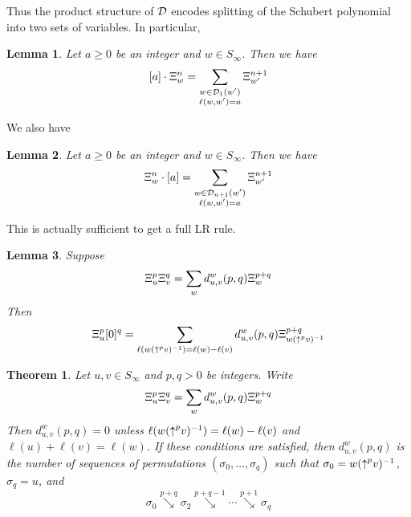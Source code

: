 \documentclass{amsart}
\newtheorem{lemma}{Lemma}[subsection]
\newtheorem{theorem}{Theorem}[section]
\theoremstyle{definition}
\theoremstyle{remark}
\numberwithin{equation}{subsection}
\newcommand{\downvar}[1]{\stackrel{#1}{\searrow}}
\begin{document}
Thus the product structure of $\mathcal{D}$ encodes splitting of the Schubert polynomial into two sets of variables. In particular,
\begin{lemma} \label{lemma:dpieri}
Let $a\geq 0$ be an integer and $w\in S_\infty$. Then we have
$$[a]\cdot \Xi_{w}^{n} = \sum_{\substack{w\in\mathcal{D}_1(w')\\\ell(w,w')=a}} \Xi_{w'}^{n+1}$$
\end{lemma}

We also have
\begin{lemma} \label{lemma:dpieriend}
Let $a\geq 0$ be an integer and $w\in S_\infty$. Then we have
$$\Xi_{w}^{n}\cdot [a] = \sum_{\substack{w\in\mathcal{D}_{n+1}(w')\\\ell(w,w')=a}} \Xi_{w'}^{n+1}$$
\end{lemma}


This is actually sufficient to get a full LR rule.

\begin{lemma}
Suppose
$$\Xi_u^p\Xi_v^q=\sum_{w}d_{u,v}^w(p,q)\Xi_w^{p+q}$$
Then
$$\Xi_u^p[0]^q=\sum_{\ell(w({\uparrow}^{p}v)^{-1})=\ell(w)-\ell(v)}d_{u,v}^w(p,q)\Xi_{w({\uparrow}^{p}v)^{-1}}^{p+q}$$
\end{lemma}

\begin{theorem} \label{theorem:LRdual}
Let $u,v\in S_\infty$ and $p,q>0$ be integers. Write
$$\Xi_u^p\Xi_v^q = \sum_w d_{u,v}^w(p,q)\Xi_w^{p+q}$$
Then $d_{u,v}^w(p,q)=0$ unless $\ell(w({\uparrow}^{p}v)^{-1}) = \ell(w)-\ell(v)$ and $\ell(u)+\ell(v)=\ell(w)$. If these conditions are satisfied, then $d_{u,v}^w(p,q)$ is the number of sequences of permutations $(\sigma_0,\ldots,\sigma_q)$ such that $\sigma_0 = w({\uparrow}^{p}v)^{-1}$, $\sigma_q = u$, and
$$\sigma_0\downvar{p+q}\sigma_2\downvar{p+q-1}\cdots \downvar{p+1}\sigma_{q}$$
\end{theorem}
\end{document}

